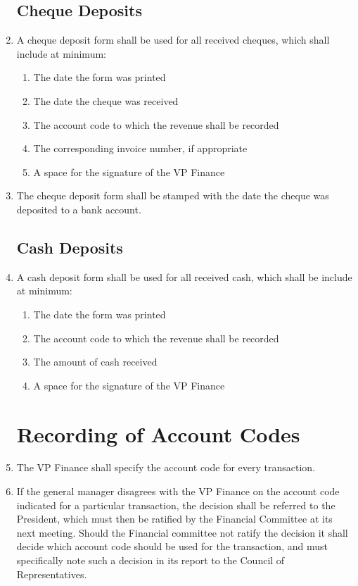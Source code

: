 \documentclass[oneside]{book}
\begin{document}
\begin{enumerate}
\section{\label{Cheque_Deposits}Cheque Deposits}

\item A cheque deposit form shall be used for all received cheques, which shall include at minimum:
	\begin{enumerate}
	\item The date the form was printed
	\item The date the cheque was received
	\item The account code to which the revenue shall be recorded
	\item The corresponding invoice number, if appropriate
	\item A space for the signature of the VP Finance
	\end{enumerate}
\item The cheque deposit form shall be stamped with the date the cheque was deposited to a bank account.

\section{\label{Cash_Deposits}Cash Deposits}

\item A cash deposit form shall be used for all received cash, which shall be include at minimum:
	\begin{enumerate}
	\item The date the form was printed
	\item The account code to which the revenue shall be recorded
	\item The amount of cash received
	\item A space for the signature of the VP Finance
	\end{enumerate}

\chapter{\label{Recording_of_Account_Codes}Recording of Account Codes}
	
\item The VP Finance shall specify the account code for every transaction. 
\item If the general manager disagrees with the VP Finance on
the account code indicated for a particular transaction, the decision shall
be referred to the President, which must then be ratified by the Financial 
Committee at its next meeting. Should the Financial committee not
ratify the decision it shall decide which account code should be used for 
the transaction, and must specifically note such a decision in its report to the Council of
Representatives. 
	

\end{enumerate}
\end{document}
